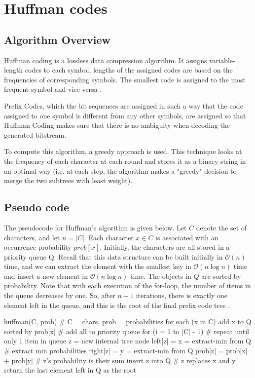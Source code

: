 \documentclass[12pt, authoryear]{elsarticle}
\begin{document}
\section{Huffman codes}

\subsection{Algorithm Overview}

Huffman coding is a lossless data compression algorithm. It assigns variable-length codes to each symbol, lengths of the assigned codes are based on the frequencies of corresponding symbols. The smallest code is assigned to the most frequent symbol and vice versa \citep{kleinberg2006algorithm}.

Prefix Codes, which the bit sequences are assigned in such a way that the code assigned to one symbol is different from any other symbols, are assigned so that Huffman Coding makes sure that there is no ambiguity when decoding the generated bitstream.

To compute this algorithm, a greedy approach is used. This technique looks at the frequency of each character at each round and stores it as a binary string in an optimal way (i.e. at each step, the algorithm makes a "greedy" decision to merge the two subtrees with least weight).

\subsection{Pseudo code} 

The pseudocode for Huffman’s algorithm is given below. Let $C$ denote the set of characters,
and let $n = |C|$. Each character $x \in C$ is associated with an occurrence probability $prob[x]$. Initially, the characters are all stored in a priority queue Q. Recall that this data structure
can be built initially in $\mathcal{O}(n)$ time, and we can extract the element with the smallest key in
$\mathcal{O}(n \log n)$ time and insert a new element in $\mathcal{O}(n \log n)$ time. The objects in $Q$ are sorted by probability. Note that with each execution of the for-loop, the number of items in the queue decreases by one. So, after $n - 1$ iterations, there is exactly one element left in the queue,
and this is the root of the final prefix code tree \citep{greedy}. \\

\begin{python}
huffman(C, prob) { # C = chars, prob = probabilities
   for each (x in C) {
      add x to Q sorted by prob[x] # add all to priority queue
   }
   for (i = 1 to |C| - 1) { # repeat until only 1 item in queue
	z = new internal tree node
	left[z] = x = extract-min from Q # extract min probabilities
	right[z] = y = extract-min from Q
	prob[z] = prob[x] + prob[y] # z's probability is their sum
	insert z into Q # z replaces x and y
   }
   return the last element left in Q as the root
}
\end{python}
\end{document}

